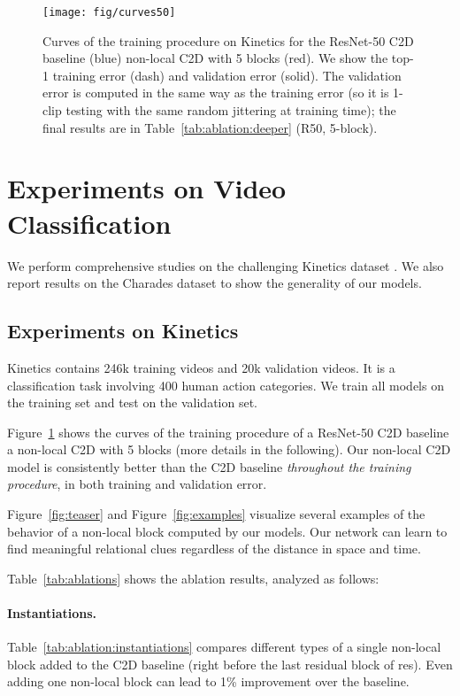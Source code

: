 \documentclass[10pt,twocolumn,letterpaper]{article}
\begin{document}
\begin{figure}[t]
\centering
\texttt{[image: fig/curves50]}
\caption{Curves of the training procedure on Kinetics for the ResNet-50 C2D baseline (blue) \vs non-local C2D with 5 blocks (red). We show the top-1 training error (dash) and validation error (solid). The validation error is computed in the same way as the training error (so it is 1-clip testing with the same random jittering at training time); the final results are in Table~\ref{tab:ablation:deeper} (R50, 5-block).  }
\label{fig:curves}
\end{figure}


\section{Experiments on Video Classification}

We perform comprehensive studies on the challenging Kinetics dataset \cite{Kay2017}. We also report results on the Charades dataset \cite{Sigurdsson2016} to show the generality of our models.

\subsection{Experiments on Kinetics}

Kinetics \cite{Kay2017} contains 246k training videos and 20k validation videos. It is a classification task involving 400 human action categories. We train all models on the training set and test on the validation set.

Figure~\ref{fig:curves} shows the curves of the training procedure of a ResNet-50 C2D baseline \vs a non-local C2D with 5 blocks (more details in the following). Our non-local C2D model is consistently better than the C2D baseline \emph{throughout the training procedure}, in both training and validation error.

Figure~\ref{fig:teaser} and Figure~\ref{fig:examples} visualize several examples of the behavior of a non-local block computed by our models. Our network can learn to find meaningful relational clues regardless of the distance in space and time.

Table~\ref{tab:ablations} shows the ablation results, analyzed as follows:

\paragraph{Instantiations.} Table~\ref{tab:ablation:instantiations} compares different types of a single non-local block added to the C2D baseline (right before the last residual block of res). Even adding one non-local block can lead to  1\% improvement over the baseline.
\end{document}
